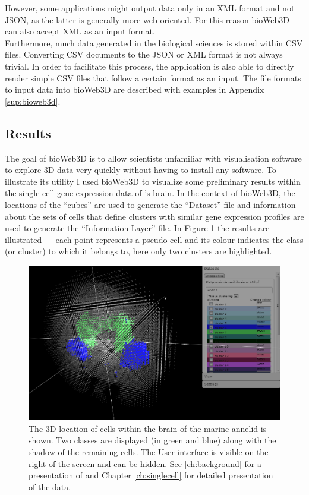 However, some applications might output data only in an XML format and not JSON, as the latter is generally more web oriented. For this reason bioWeb3D can also accept XML as an input format.\\

Furthermore, much data generated in the biological sciences is stored within CSV files. Converting CSV documents to the JSON or XML format is not always trivial. In order to facilitate this process, the application is also able to directly render simple CSV files that follow a certain format as an input. The file formats to input data into bioWeb3D are described with examples in Appendix \ref{sup:bioweb3d}.

	\subsection{Results}

	The goal of bioWeb3D is to allow scientists unfamiliar with visualisation software to explore 3D data very quickly without having to install any software.
	To illustrate its utility I used bioWeb3D to visualize some preliminary results within the single cell gene expression data of \platy{}'s brain. In the context of bioWeb3D, the locations of the ``cubes'' are used to generate the ``Dataset'' file and information about the sets of cells that define clusters with similar gene expression profiles are used to generate the ``Information Layer'' file. In Figure \ref{fig:bioweb3d} the results are illustrated ---  each point represents a pseudo-cell and its colour indicates the class (or cluster) to which it belongs to, here only two clusters are highlighted. 
	
	\begin{figure}[h]
\centerline{\includegraphics[width=\linewidth]{gfx/chapter3/bioweb3d.png}}
\caption{The 3D location of cells within the brain of the marine annelid \platyfull{} is shown. Two classes are displayed (in green and blue) along with the shadow of the remaining cells. The User interface is visible on the right of the screen and can be hidden. See \ref{ch:background} for a presentation of \platy{} and Chapter \ref{ch:singlecell} for detailed presentation of the data.}\label{fig:bioweb3d}
	\end{figure}

